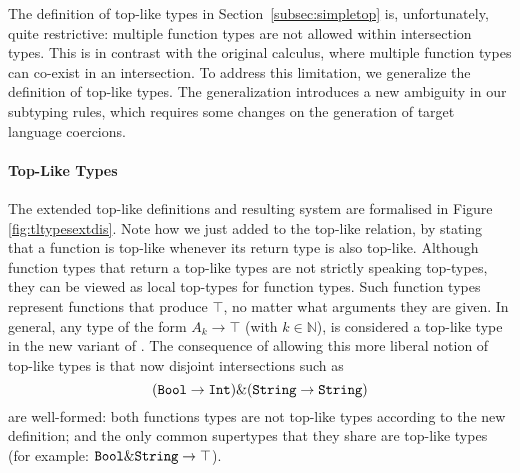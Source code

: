 The definition of top-like types in Section~\ref{subsec:simpletop} is,
unfortunately, quite restrictive: multiple function types are not allowed
within intersection types. This is in contrast with the original \name
calculus, where multiple function types can co-exist in an
intersection. To address this limitation, we generalize the definition
of top-like types. The generalization introduces a new ambiguity in
our subtyping rules, which requires some changes on the generation of target
language coercions.

\paragraph{Top-Like Types}
The extended top-like definitions and resulting system are formalised
in Figure \ref{fig:tltypesextdis}.  Note how we just added
 to the top-like relation, by stating that a
function is top-like whenever its return type is also
top-like. Although function types that return a top-like types are not
strictly speaking top-types, they can be viewed as local top-types for function
types. Such function types represent functions that produce $\top$, no
matter what arguments they are given.  In general, any type of the
form $A_k \to \top$ (with $k \in \mathbb{N}$), is considered a
top-like type in the new variant of \name. The consequence of allowing 
this more liberal notion of top-like types is that now disjoint
intersections such as \[ (\texttt{Bool} \to \texttt{Int}) \& (\texttt{String} \to \texttt{String}) \]
are well-formed: both functions types are not top-like types according
to the new definition; and the only common supertypes that they share
are top-like types (for example: $\texttt{Bool}\&\texttt{String} \to \texttt{$\top$}$).

